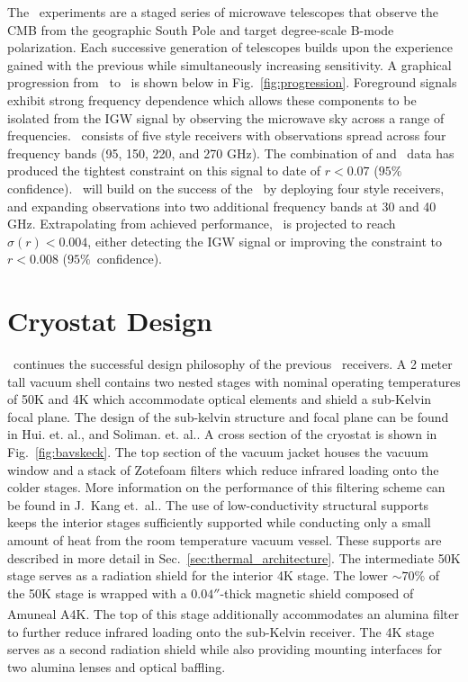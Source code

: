 \documentclass[]{spie}
\begin{document}
The \bk\ experiments are a staged series of microwave telescopes that observe
the CMB from the geographic South Pole and target degree-scale B-mode
polarization. Each successive generation of telescopes builds upon the
experience gained with the previous while simultaneously increasing
sensitivity. A graphical progression from \ to \biceparray\ is shown
below in Fig.~\ref{fig:progression}. Foreground signals exhibit strong
frequency dependence which allows these components to be isolated from the IGW
signal by observing the microwave sky across a range of frequencies.
\keckarray\ consists of five  style receivers\cite{ogburn2010,sheehy2010} with observations spread
across four frequency bands (95, 150, 220, and 270 GHz). The combination of
  and \keckarray\ data has produced the tightest constraint on
this signal to date of $r<0.07$ ($95\%$ confidence)\cite{bk_vi}. \biceparray\ will build on the success
of the \keckarray\ by deploying four  style receivers\cite{ahmed2014}, and expanding
observations into two additional frequency bands at 30 and 40 GHz.
Extrapolating from achieved performance, \biceparray\ is projected to reach
$\sigma(r)<0.004$, either detecting the IGW signal or improving the constraint
to $r<0.008$ ($95\%$~confidence). 



	
\section{Cryostat Design}

\biceparray\ continues the successful design philosophy of
the previous \bk\ receivers. A 2 meter tall vacuum shell contains two nested
stages with nominal operating temperatures of 50K and 4K which accommodate
optical elements and shield a sub-Kelvin focal plane. The design of the
sub-kelvin structure and focal plane can be found in Hui. et.
al.\cite{hui2018}, and Soliman. et. al.\cite{soliman2018}. A cross section of
the cryostat is shown in Fig.~\ref{fig:bavskeck}. The top section of the vacuum
jacket houses the vacuum window and a stack of Zotefoam filters which reduce
infrared loading onto the colder stages. More information on the performance of
this filtering scheme can be found in J.~Kang et.~al.\cite{kang2018}. The use
of low-conductivity structural supports keeps the interior stages sufficiently
supported while conducting only a small amount of heat from the room
temperature vacuum vessel.  These supports are described in more detail in
Sec.~\ref{sec:thermal_architecture}. The intermediate 50K stage serves as a
radiation shield for the interior 4K stage.  The lower $\sim70\%$ of the 50K
stage is wrapped with a $0.04''$-thick magnetic shield composed of
Amuneal\cite{amuneal} A4K\textsuperscript{\textregistered}.  The top of this
stage additionally accommodates an alumina filter to further reduce infrared
loading onto the sub-Kelvin receiver. The 4K stage serves as a second radiation
shield while also providing mounting interfaces for two alumina lenses and
optical baffling.
\end{document}
